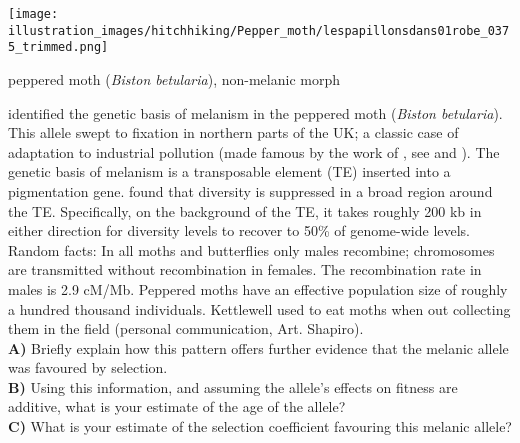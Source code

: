 \begin{marginfigure}[5cm]
\begin{center}\texttt{[image: illustration\_images/hitchhiking/Pepper\_moth/lespapillonsdans01robe\_0375\_trimmed.png]}
\end{center}
\caption{peppered moth ({\it Biston betularia}), non-melanic morph  } \label{Peppered_moth}
\end{marginfigure}
\begin{question}
\citet{van2011industrial} identified the genetic basis of
melanism in the peppered moth ({\it Biston betularia}). This allele swept to fixation in northern
parts of the UK; a classic case of adaptation to industrial pollution
(made famous by the work of \citeauthor{kettlewell1955selection}, see
\citet{majerus2009industrial} and \citet{cook2012selective}). The genetic basis of melanism
is a transposable element (TE) inserted into a pigmentation gene. \citeauthor{van2011industrial} found that diversity is suppressed in a broad region
around the TE. Specifically, on the background of the TE, it takes
roughly 200 kb in either direction for diversity levels to recover to
50\% of genome-wide levels. \\

Random facts: In all moths and butterflies only males recombine;
chromosomes are transmitted without recombination in females. The
recombination rate in males is 2.9 cM/Mb.  Peppered moths have an
effective population size of roughly a hundred thousand
individuals. Kettlewell used to eat moths when out collecting them in
the field (personal communication, Art. Shapiro). \\
{\bf A)} Briefly explain how this pattern offers further evidence that the melanic allele was favoured by selection.\\
{\bf B)} Using this information, and assuming the allele's effects on fitness are additive, what is your estimate of the age of the allele? \\
{\bf C)} What is your estimate of the selection coefficient favouring this melanic allele?
\end{question}


